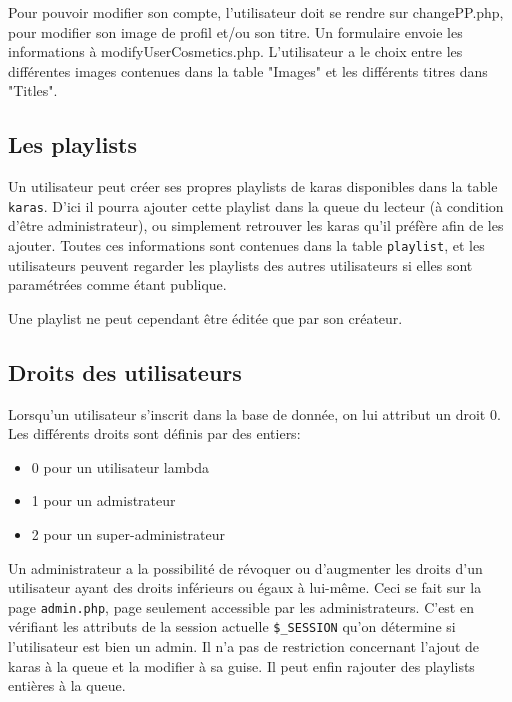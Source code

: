 Pour pouvoir modifier son compte, l'utilisateur doit se rendre sur changePP.php, pour modifier son image de profil et/ou son titre. Un formulaire envoie les informations à modifyUserCosmetics.php. L'utilisateur a le choix entre les différentes images contenues dans la table "Images" et les différents titres dans "Titles". \newline

\subsection{Les playlists}

Un utilisateur peut créer ses propres playlists de karas disponibles dans la table \texttt{karas}.
D'ici il pourra ajouter cette playlist dans la queue du lecteur (à condition d'être administrateur), ou simplement retrouver les karas qu'il préfère afin de les ajouter.
Toutes ces informations sont contenues dans la table \texttt{playlist}, et les utilisateurs peuvent regarder les playlists des autres utilisateurs si elles sont paramétrées comme étant publique.

Une playlist ne peut cependant être éditée que par son créateur.

\subsection{Droits des utilisateurs}
Lorsqu'un utilisateur s'inscrit dans la base de donnée, on lui attribut un droit 0. Les différents droits sont définis par des entiers:
\begin{itemize}
	\item 0 pour un utilisateur lambda
	\item 1 pour un admistrateur
	\item 2 pour un super-administrateur
\end{itemize}
Un administrateur a la possibilité de révoquer ou d'augmenter les droits d'un utilisateur ayant des droits inférieurs ou égaux à lui-même. Ceci se fait sur la page \texttt{admin.php}, page seulement accessible par les administrateurs. C'est en vérifiant les attributs de la session actuelle \texttt{\$\_SESSION} qu'on détermine si l'utilisateur est bien un admin. Il n'a pas de restriction concernant l'ajout de karas à la queue et la modifier à sa guise. Il peut enfin rajouter des playlists entières à la queue.
